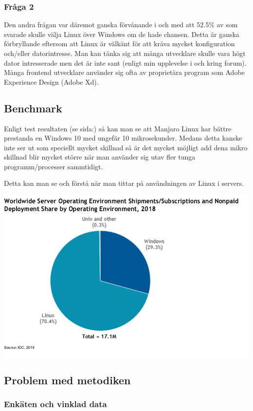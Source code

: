 \documentclass[12pt, a4paper]{report}
\begin{document}
\subsubsection{Fråga 2}
Den andra frågan var däremot ganska förvånande i och med att 52.5\% av som svarade skulle välja Linux över Windows om de hade chansen. Detta är ganska förbryllande eftersom att Linux är välkänt för att kräva mycket konfiguration och/eller datorintresse. Man kan tänka sig att många utvecklare skulle vara högt dator intresserade men det är inte sant (enligt min upplevelse i och kring forum). Många frontend utvecklare använder sig ofta av proprietära program som Adobe Experience Design (Adobe Xd). 


\subsection{Benchmark}

Enligt test resultaten (se sida:\pageref{tests}) så kan man se att Manjaro Linux har bättre prestanda en Windows 10 med ungefär 10 mikrosekunder. Medans detta kanske inte ser ut som speciellt mycket skillnad så är det mycket möjligt add dena mikro skillnad blir mycket större när man använder sig utav fler tunga programm/processer sammtidigt.

Detta kan man se och förstå när man tittar på användningen av Linux i servers.

\vspace{1cm}
\includegraphics[width=.6\textwidth]{IDC.png}\cite{linux-market}


\subsection{Problem med metodiken}

\subsubsection{Enkäten och vinklad data}
\end{document}
